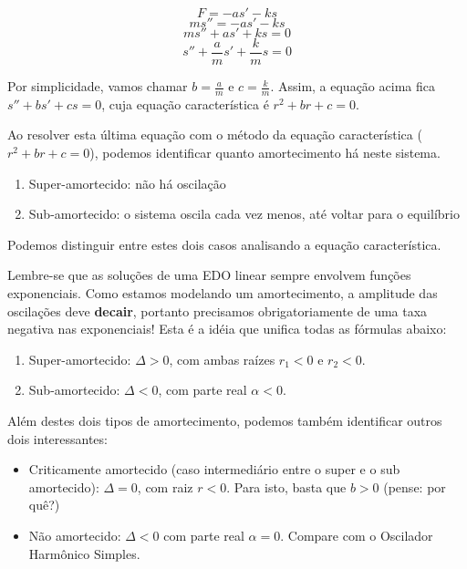 \documentclass[a4paper]{article}
\begin{document}
\begin{displaymath}
  F = - as' -ks
\end{displaymath}
\begin{displaymath}
  ms'' = -as' -ks
\end{displaymath}
\begin{displaymath}
  ms'' +as' + ks =0
\end{displaymath}
\begin{displaymath}
  s'' +\frac{a}{m}s' + \frac{k}{m}s  =0
\end{displaymath}

Por simplicidade, vamos chamar $b=\frac{a}{m}$ e
$c=\frac{k}{m}$. Assim, a equação acima fica $s''+bs'+cs=0$, cuja
equação característica é $r^2+br+c=0$.

Ao resolver esta última equação com o método da equação característica
($r^2+br+c=0$), podemos identificar quanto amortecimento há neste sistema.

\begin{enumerate}
\item Super-amortecido: não há oscilação
\item Sub-amortecido: o sistema oscila cada vez menos, até voltar para
  o equilíbrio
\end{enumerate}

Podemos distinguir entre estes dois casos analisando a equação
característica.

Lembre-se que as soluções de uma EDO linear sempre envolvem funções
exponenciais. Como estamos modelando um amortecimento, a amplitude das
oscilações deve {\bf decair}, portanto precisamos obrigatoriamente de
uma taxa negativa nas exponenciais! Esta é a idéia que unifica todas
as fórmulas abaixo:

\begin{enumerate}
\item Super-amortecido: $\Delta>0$, com ambas raízes $r_1<0$ e
  $r_2<0$.
\item Sub-amortecido: $\Delta<0$, com parte real $\alpha<0$.
\end{enumerate}

Além destes dois tipos de amortecimento, podemos também identificar
outros dois interessantes:

\begin{itemize}
\item Criticamente amortecido (caso intermediário entre o super e o
  sub amortecido): $\Delta=0$, com raiz $r<0$. Para isto, basta que
  $b>0$ (pense: por quê?)
\item Não amortecido: $\Delta<0$ com parte real $\alpha=0$. Compare
  com o Oscilador Harmônico Simples.
\end{itemize}
\end{document}
